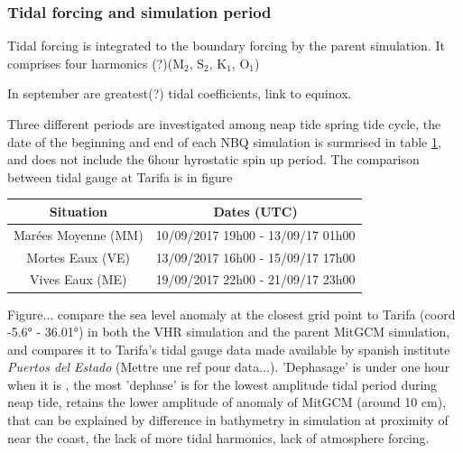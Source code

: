 \subsubsection{Tidal forcing and simulation period}
Tidal forcing is integrated to the boundary forcing by the parent simulation. It comprises four harmonics (?)($\text{M}_{\text{2}}$, $\text{S}_{\text{2}}$, $\text{K}_{\text{1}}$, $\text{O}_{\text{1}}$)

In september are greatest(?) tidal coefficients, link to equinox.

Three different periods are investigated among neap tide spring tide cycle, the date of the beginning and end of each NBQ simulation is surmrised in table \ref{tab_dates_MIV}, and does not include the 6hour hyrostatic spin up period. The comparison between tidal gauge at Tarifa is in figure 

\begin{table}[h]
        \centering
        \begin{tabular}{|c|c|}
                \hline
                Situation & Dates (UTC)\\
                \hline
                Marées Moyenne (MM) & 10/09/2017 19h00 - 13/09/17 01h00  \\
                Mortes Eaux (VE) & 13/09/2017 16h00 - 15/09/17 17h00 \\
                Vives Eaux (ME) & 19/09/2017 22h00 - 21/09/17 23h00  \\
                \hline
        \end{tabular}
        \label{tab_dates_MIV}
\end{table}

Figure... compare the sea level anomaly at the closest grid point to Tarifa (coord -5.6° - 36.01°) in both the VHR simulation and the parent MitGCM simulation, and compares it to Tarifa's tidal gauge data made available by spanish institute \textit{Puertos del Estado} (Mettre une ref pour data...). 'Dephasage' is under one hour when it is , the most 'dephase' is for the lowest amplitude tidal period during neap tide, retains the lower amplitude of anomaly of MitGCM (around 10 cm), that can be explained by difference in bathymetry in simulation at proximity of near the coast, the lack of more tidal harmonics, lack of atmosphere forcing.

